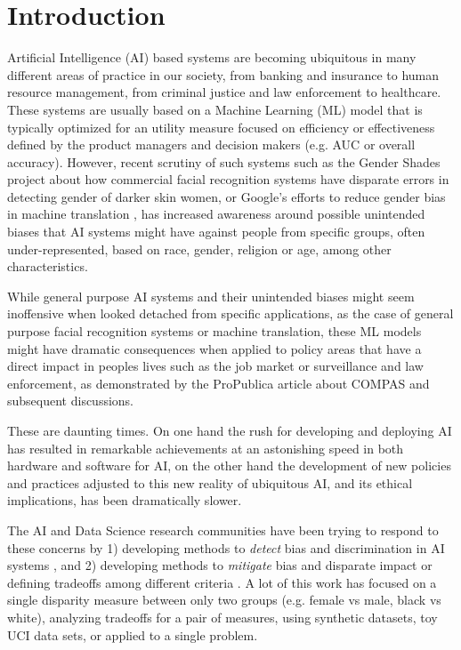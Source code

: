 

\section{Introduction}

Artificial Intelligence (AI) based systems are becoming ubiquitous in many different areas of practice in our society, from banking and insurance to human resource management, from criminal justice and law enforcement to healthcare. These systems are usually based on a Machine Learning (ML) model that is typically optimized for an utility measure focused on efficiency or effectiveness defined by the product managers and decision makers (e.g. AUC or overall accuracy). However, recent scrutiny of such systems such as the Gender Shades project  \cite{buolamwini2018gender} about how commercial facial recognition systems have disparate errors in detecting gender of darker skin women, or Google's efforts to reduce gender bias in machine translation \cite{kuczmarski2019translation}, has increased awareness around possible unintended biases that AI systems might have against people from specific groups, often under-represented, based on race, gender, religion or age, among other characteristics. 

While general purpose AI systems and their unintended biases might seem inoffensive when looked detached from specific applications, as the case of general purpose facial recognition systems or machine translation, these ML models might have dramatic consequences when applied to policy areas that have a direct impact in peoples lives such as the job market or surveillance and law enforcement, as demonstrated by the ProPublica article about COMPAS \cite{angwin2016machine} and subsequent discussions. 

These are daunting times. On one hand the rush for developing and deploying AI has resulted in remarkable achievements at an astonishing speed in both hardware and software for AI, on the other hand the development of new policies and practices adjusted to this new reality of ubiquitous AI, and its ethical implications, has been dramatically slower. 

The AI and Data Science research communities have been trying to respond to these concerns by 1) developing methods to \textit{detect} bias and discrimination in AI systems \cite{calders2010three,dwork2012fairness,zemel2013learning,hardt2016equality,zafar2017parity,zafar2017fairnessw}, and 2) developing methods to \textit{mitigate} bias and disparate impact or defining tradeoffs among different criteria \cite{hardt2016equality,kamishima2011fairness,feldman2015certifying,kleinberg2016inherent,corbett2017algorithmic,zafar2017fairnessw, kearns2017preventing, noriega2018active}. A lot of this work has focused on a single disparity measure between only two groups (e.g. female vs male, black vs white), analyzing tradeoffs for a pair of measures, using synthetic datasets, toy UCI data sets, or applied to a single problem. 

